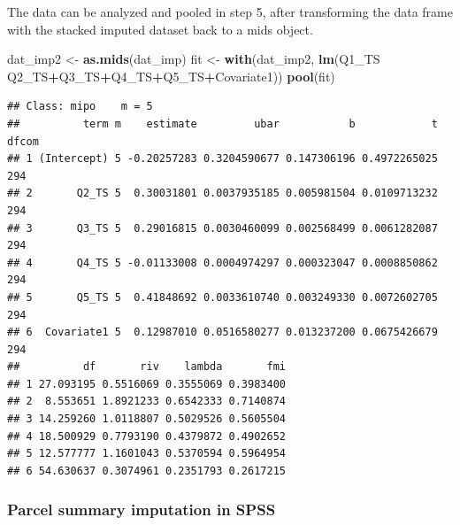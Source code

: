 \documentclass[
]{book}
\newenvironment{Shaded}{\begin{snugshade}}{\end{snugshade}}
\newcommand{\DataTypeTok}[1]{\textcolor[rgb]{0.13,0.29,0.53}{#1}}
\newcommand{\KeywordTok}[1]{\textcolor[rgb]{0.13,0.29,0.53}{\textbf{#1}}}
\newcommand{\NormalTok}[1]{#1}
\newcommand{\OperatorTok}[1]{\textcolor[rgb]{0.81,0.36,0.00}{\textbf{#1}}}
\newcommand{\OtherTok}[1]{\textcolor[rgb]{0.56,0.35,0.01}{#1}}
\newcommand{\StringTok}[1]{\textcolor[rgb]{0.31,0.60,0.02}{#1}}
\begin{document}
\begin{Shaded}
\end{Shaded}

The data can be analyzed and pooled in step 5, after transforming the data frame with the stacked imputed dataset back to a mids object.

\begin{Shaded}
\begin{Highlighting}[]
\NormalTok{dat_imp2 <-}\StringTok{ }\KeywordTok{as.mids}\NormalTok{(dat_imp)}
\NormalTok{fit <-}\StringTok{ }\KeywordTok{with}\NormalTok{(dat_imp2, }\KeywordTok{lm}\NormalTok{(Q1_TS}\OperatorTok{~}\StringTok{ }\NormalTok{Q2_TS}\OperatorTok{+}\NormalTok{Q3_TS}\OperatorTok{+}\NormalTok{Q4_TS}\OperatorTok{+}\NormalTok{Q5_TS}\OperatorTok{+}\NormalTok{Covariate1))}
\KeywordTok{pool}\NormalTok{(fit)}
\end{Highlighting}
\end{Shaded}

\begin{verbatim}
## Class: mipo    m = 5 
##          term m    estimate         ubar           b            t dfcom
## 1 (Intercept) 5 -0.20257283 0.3204590677 0.147306196 0.4972265025   294
## 2       Q2_TS 5  0.30031801 0.0037935185 0.005981504 0.0109713232   294
## 3       Q3_TS 5  0.29016815 0.0030460099 0.002568499 0.0061282087   294
## 4       Q4_TS 5 -0.01133008 0.0004974297 0.000323047 0.0008850862   294
## 5       Q5_TS 5  0.41848692 0.0033610740 0.003249330 0.0072602705   294
## 6  Covariate1 5  0.12987010 0.0516580277 0.013237200 0.0675426679   294
##          df       riv    lambda       fmi
## 1 27.093195 0.5516069 0.3555069 0.3983400
## 2  8.553651 1.8921233 0.6542333 0.7140874
## 3 14.259260 1.0118807 0.5029526 0.5605504
## 4 18.500929 0.7793190 0.4379872 0.4902652
## 5 12.577777 1.1601043 0.5370594 0.5964954
## 6 54.630637 0.3074961 0.2351793 0.2617215
\end{verbatim}

\hypertarget{parcel-summary-imputation-in-spss}{%
\subsubsection{Parcel summary imputation in SPSS}\label{parcel-summary-imputation-in-spss}}
\end{document}
